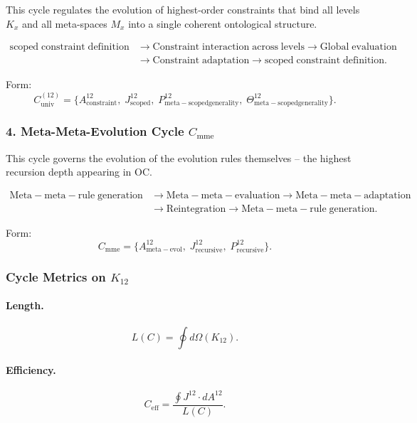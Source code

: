 This cycle regulates the evolution of highest-order constraints that bind all
levels $K_x$ and all meta-spaces $M_x$ into a single coherent ontological
structure.

\[
  \begin{aligned}
  \mathrm{scoped\;constraint\;definition}
  &\to \mathrm{Constraint\;interaction\;across\;levels}
  \to \mathrm{Global\;evaluation}\\
  &\to \mathrm{Constraint\;adaptation}
  \to \mathrm{scoped\;constraint\;definition}.
  \end{aligned}
\]

Form:
\[
  C_{\mathrm{univ}}^{(12)}
  =
  \{
    A^{12}_{\mathrm{constraint}},\;
    J^{12}_{\mathrm{scoped}},\;
    P^{12}_{\mathrm{meta\!-\!scoped generality}},\;
    \Theta^{12}_{\mathrm{meta\!-\!scoped generality}}
  \}.
\]


\subsubsection{4. Meta-Meta-Evolution Cycle $C_{\mathrm{mme}}$}

This cycle governs the evolution of the evolution rules themselves --
the highest recursion depth appearing in OC.

\[
  \begin{aligned}
  \mathrm{Meta\!-\!meta\!-\!rule\;generation}
  &\to \mathrm{Meta\!-\!meta\!-\!evaluation}
  \to \mathrm{Meta\!-\!meta\!-\!adaptation}\\
  &\to \mathrm{Reintegration}
  \to \mathrm{Meta\!-\!meta\!-\!rule\;generation}.
  \end{aligned}
\]

Form:
\[
  C_{\mathrm{mme}}
  =
  \{
     A^{12}_{\mathrm{meta\!-\!evol}},\;
     J^{12}_{\mathrm{recursive}},\;
     P^{12}_{\mathrm{recursive}}
  \}.
\]


\subsubsection{Cycle Metrics on $K_{12}$}

\paragraph{Length.}
\[
  L(C)=\oint d\Omega(K_{12}).
\]

\paragraph{Efficiency.}
\[
  C_{\mathrm{eff}}
  = \frac{\oint J^{12}\cdot dA^{12}}{L(C)}.
\]

